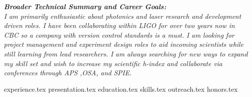 \documentclass[11pt, a4paper]{awesome-cv}
\newcommand*{\sectiondir}{cv/}
\begin{document}
\makecvheader

\vspace{1.0mm}
\begin{justify}
\bodyfont\itshape\color{darktext}
\textbf{Broader Technical Summary and Career Goals:} \\ 
I am primarily enthusiastic about photonics and laser research and development driven roles. I have been collaborating within LIGO for over two years now in CBC so a company with version control standards is a must. I am looking for project management and experiment design roles to aid incoming scientists while still learning from lead researchers. I am always searching for new ways to expand my skill set and wish to increase my scientific h-index and collaborate via conferences through APS ,OSA, and SPIE. 
\end{justify}
\vspace{1.0mm}

{experience.tex}
{presentation.tex}
{education.tex} 
\newpage
{skills.tex} 
\vspace{3.0mm}
{outreach.tex}
\vspace{3.0mm}
{honors.tex}
\end{document}

